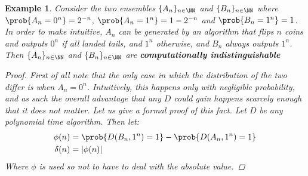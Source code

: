 \documentclass{article}
\newtheorem{example}{Example}
\begin{document}
\begin{example}
Consider the two ensembles $\{A_n\}_{n \in \NN}$ and $\{B_n\}_{n \in \NN}$ where $\prob{A_n = 0^n} = 2^{-n}$, $\prob{A_n = 1^n} = 1 - 2^{-n}$ and $\prob{B_n = 1^n} = 1$. In order to make intuitive, $A_n$ can be generated by an algorithm that flips $n$ coins and outputs $0^n$ if all landed tails, and $1^n$ otherwise, and $B_n$ always outputs $1^n$. Then $\{A_n\}_{n \in \NN}$ and $\{B_n\}_{n \in \NN}$ are \textbf{computationally indistinguishable}
\begin{proof}
First of all note that the only case in which the distribution of the two differ is when $A_n = 0^n$. Intuitively, this happens only with negligible probability, and as such the overall advantage that any $D$ could gain happens scarcely enough that it does not matter. Let us give a formal proof of this fact. Let $D$ be any polynomial time algorithm. Then let: 
\begin{align*}
    \phi(n) &=  \prob{D(B_n, 1^n) = 1} - \prob{D(A_n, 1^n) = 1} \\
    \delta(n) &= \left| \phi(n) \right| 
\end{align*}
Where $\phi$ is used so not to have to deal with the absolute value. 


\end{proof}
\end{example}
\end{document}
